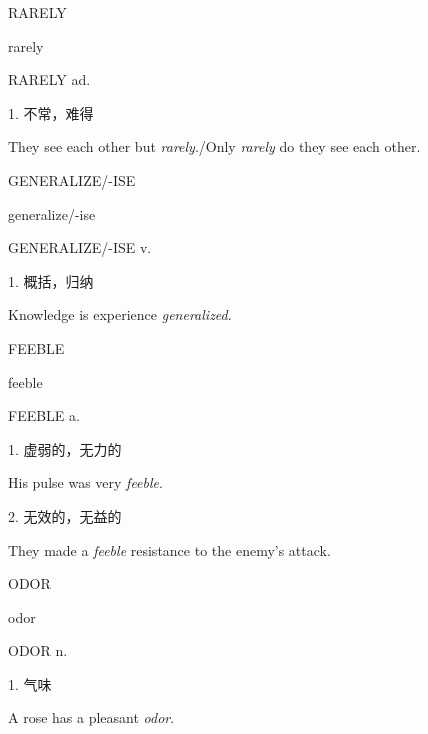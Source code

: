 \begin{flashcard}{
RARELY

rarely
}
\begin{center}
RARELY ad. 
\end{center}
1. 不常，难得

They see each other but \textit{rarely}./Only \textit{rarely} do they see each other.

\end{flashcard}
\begin{flashcard}{
GENERALIZE/-ISE

generalize/-ise
}
\begin{center}
GENERALIZE/-ISE v. 
\end{center}
1. 概括，归纳

Knowledge is experience \textit{generalized}.

\end{flashcard}
\begin{flashcard}{
FEEBLE

feeble
}
\begin{center}
FEEBLE a. 
\end{center}
1. 虚弱的，无力的

His pulse was very \textit{feeble}.

2. 无效的，无益的

They made a \textit{feeble} resistance to the enemy's attack.

\end{flashcard}
\begin{flashcard}{
ODOR

odor
}
\begin{center}
ODOR n. 
\end{center}
1. 气味

A rose has a pleasant \textit{odor}.

\end{flashcard}
